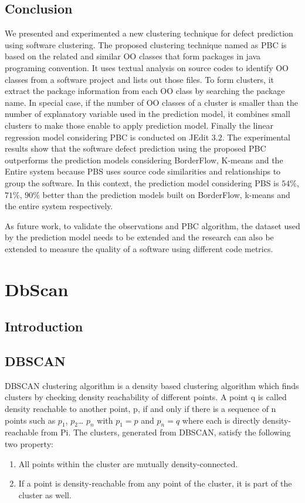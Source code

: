 \documentclass[12pt]{report}
\begin{document}
\section{Conclusion}

We presented and experimented a new clustering technique for defect prediction using software clustering. The proposed clustering technique named as PBC is based on the related and similar OO classes that form packages in java programing convention. It uses textual analysis on source codes to identify OO classes from a software project and lists out those files. To form clusters, it extract the package information from each OO class by searching the package name. In special case, if the number of OO classes of a cluster is smaller than the number of explanatory variable used in the prediction model, it combines small clusters to make those enable to apply prediction model. Finally the linear regression model considering PBC is conducted on JEdit $3.2$. The experimental results show that the software defect prediction using the proposed PBC outperforms the prediction models considering BorderFlow, K-means and the Entire system because PBS uses source code similarities and relationships to group the software. In this context, the prediction model considering PBS is  $54\%$, $71\%$, $90\%$ better than the prediction models built on BorderFlow, k-means and the entire system respectively. 

As future work, to validate the observations and PBC algorithm, the dataset used by the prediction model needs to be extended and the research can also be extended to measure the quality of a software using different code metrics.  

\chapter{ DbScan}
\section{Introduction}

\section{DBSCAN}
 
DBSCAN clustering algorithm is a density based clustering algorithm which finds clusters by checking density reachability of different points. A point q is called density reachable to another point, p, if and only if there is a sequence of n points such as $p_{1}$, $p_{2}$… $p_{n}$ with $p_{1}=p$ and $p_{n}=q$ where each   is directly density-reachable from Pi. The clusters, generated from DBSCAN, satisfy the following two property:
\begin{enumerate}
	\item {All points within the cluster are mutually density-connected.}
	\item {If a point is density-reachable from any point of the cluster, it is part of the cluster as well.}
\end{enumerate}
	
\end{document}
